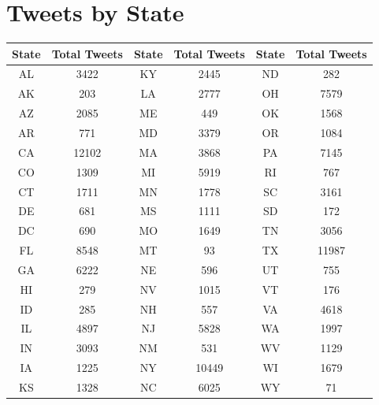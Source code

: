 \documentclass[midd]{thesis}
\begin{document}
\chapter{Tweets by State}

  \begin{tabular}{| c | c || c | c || c | c |}
  \hline
\textbf{State} & \textbf{Total Tweets} & \textbf{State} & \textbf{Total Tweets} & \textbf{State} & \textbf{Total Tweets} \\
\hline
AL & 3422 & KY & 2445 & ND & 282 \\
AK & 203 & LA & 2777 & OH & 7579 \\
AZ & 2085 & ME & 449 & OK & 1568 \\
AR & 771 & MD & 3379 & OR & 1084 \\
CA & 12102 & MA & 3868 & PA & 7145 \\
CO & 1309 & MI & 5919 & RI & 767 \\
CT & 1711 & MN & 1778 & SC & 3161 \\
DE & 681 & MS & 1111 & SD & 172 \\
DC & 690 & MO & 1649 & TN & 3056 \\
FL & 8548 & MT & 93 & TX & 11987 \\
GA & 6222 & NE & 596 & UT & 755 \\
HI & 279 & NV & 1015 & VT & 176 \\
ID & 285 & NH & 557 & VA & 4618 \\
IL & 4897 & NJ & 5828 & WA & 1997 \\
IN & 3093 & NM & 531 & WV & 1129 \\
IA & 1225 & NY & 10449 & WI & 1679 \\
KS & 1328 & NC & 6025 & WY & 71 \\
\hline
\end{tabular}
\end{document}
